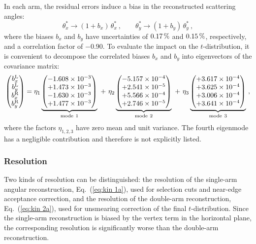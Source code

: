 In each arm, the residual errors induce a bias in the reconstructed scattering angles:
\begin{equation}
\label{eq:opt bias}
	\theta_x^* \rightarrow (1 + b_x)\, \theta_x^*\ ,\qquad
	\theta_y^* \rightarrow (1 + b_y)\, \theta_y^*\ ,
\end{equation}
where the biases $b_x$ and $b_y$ have uncertainties of $0.17\,{\rm \%}$ and $0.15\,{\rm \%}$, respectively, and a correlation factor of $-0.90$. To evaluate the impact on the $t$-distribution, it is convenient to decompose the correlated biases $b_x$ and $b_y$ into eigenvectors of the covariance matrix:
\begin{equation}
\label{eq:opt bias modes}
\begin{pmatrix} b_x^{\rm L}\cr b_y^{\rm L} \cr b_x^{\rm R}\cr b_y^{\rm R} \end{pmatrix} =
	   \eta_1 \underbrace{\begin{pmatrix} -1.608\times10^{-3}\cr +1.473\times10^{-3}\cr -1.630\times10^{-3}\cr +1.477\times10^{-3} \end{pmatrix}}_{\rm mode\ 1}
  \ +\ \eta_2 \underbrace{\begin{pmatrix} -5.157\times10^{-4}\cr +2.541\times10^{-5}\cr +5.566\times10^{-4}\cr +2.746\times10^{-5} \end{pmatrix}}_{\rm mode\ 2}
  \ +\ \eta_3 \underbrace{\begin{pmatrix} +3.617\times10^{-4}\cr +3.625\times10^{-4}\cr +3.006\times10^{-4}\cr +3.641\times10^{-4} \end{pmatrix}}_{\rm mode\ 3}\ ,
\end{equation}
where the factors $\eta_{1,2,3}$ have zero mean and unit variance. The fourth eigenmode has a negligible contribution and therefore is not explicitly listed.




\subsubsection{Resolution}
\label{sec:resolution}

Two kinds of resolution can be distinguished: the resolution of the single-arm angular reconstruction, Eq.~(\ref{eq:kin 1a}), used for selection cuts and near-edge acceptance correction, and the resolution of the double-arm reconstruction, Eq.~(\ref{eq:kin 2a}), used for unsmearing correction of the final $t$-distribution. Since the single-arm reconstruction is biased by the vertex term in the horizontal plane, the corresponding resolution is significantly worse than the double-arm reconstruction.


